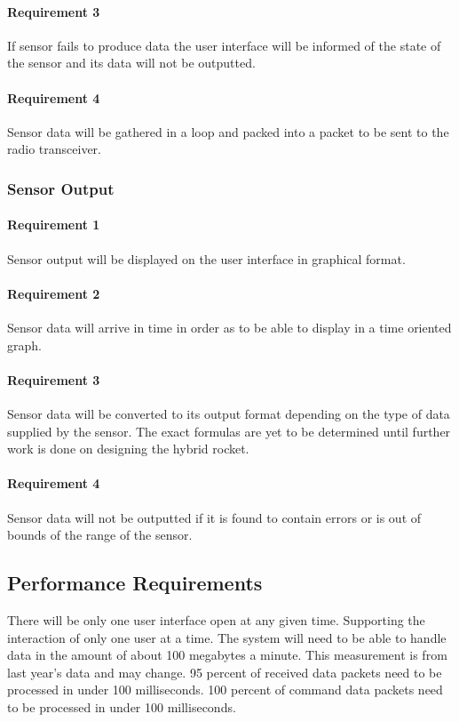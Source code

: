 \documentclass[10pt,draftclsnofoot,onecolumn,compsoc]{IEEEtran}
\begin{document}
	\paragraph{ Requirement 3}If sensor fails to produce data the user interface will be informed of the state of the sensor and its data will not be outputted.\par
	\paragraph{ Requirement 4}Sensor data will be gathered in a loop and packed into a packet to be sent to the radio transceiver.\par
\subsubsection{Sensor Output}
	\paragraph{ Requirement 1}Sensor output will be displayed on the user interface in graphical format.\par
	\paragraph{ Requirement 2}Sensor data will arrive in time in order as to be able to display in a time oriented graph.\par
	\paragraph{ Requirement 3}Sensor data will be converted to its output format depending on the type of data supplied by the sensor. The exact formulas are yet to be determined until further work is done on designing the hybrid rocket.\par
	\paragraph{ Requirement 4}Sensor data will not be outputted if it is found to contain errors or is out of bounds of the range of the sensor.\par

\subsection{ Performance Requirements}
There will be only one user interface open at any given time. Supporting the interaction of only one user at a time. The system will need to be able to handle data in the amount of about 100 megabytes a minute. This measurement is from last year's data and may change. 95 percent of received data packets need to be processed in under 100 milliseconds. 100 percent of command data packets need to be processed in under 100 milliseconds.
\end{document}
